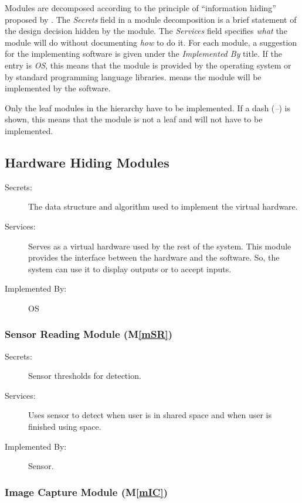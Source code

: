 \documentclass[12pt, titlepage]{article}
\newcommand{\mref}[1]{M\ref{#1}}
\begin{document}
Modules are decomposed according to the principle of ``information hiding''
proposed by \citet{ParnasEtAl1984}. The \emph{Secrets} field in a module
decomposition is a brief statement of the design decision hidden by the
module. The \emph{Services} field specifies \emph{what} the module will do
without documenting \emph{how} to do it. For each module, a suggestion for the
implementing software is given under the \emph{Implemented By} title. If the
entry is \emph{OS}, this means that the module is provided by the operating
system or by standard programming language libraries.  \emph{\progname{}} means the
module will be implemented by the \progname{} software.

Only the leaf modules in the hierarchy have to be implemented. If a dash
(\emph{--}) is shown, this means that the module is not a leaf and will not have
to be implemented.

\subsection{Hardware Hiding Modules}

\begin{description}
\item[Secrets:] The data structure and algorithm used to implement the virtual hardware.
\item[Services:] Serves as a virtual hardware used by the rest of the system. This module provides the interface between the hardware and the software. So, the system can use it to display outputs or to accept inputs.
\item[Implemented By:] OS
\end{description}

\subsubsection{Sensor Reading Module (\mref{mSR})}

\begin{description}
\item[Secrets:]Sensor thresholds for detection.
\item[Services:]Uses sensor to detect when user is in shared space and when user is finished using space.
\item[Implemented By:] Sensor.
\end{description}

\subsubsection{Image Capture Module (\mref{mIC})}
\end{document}
